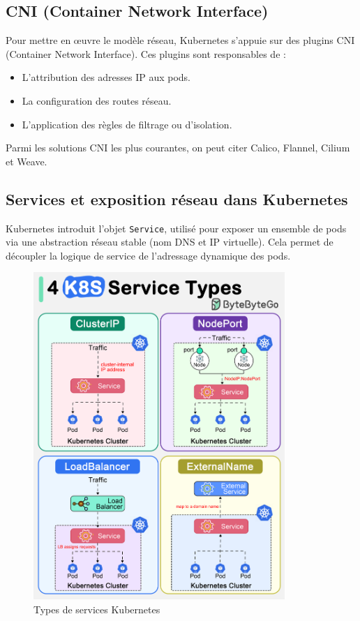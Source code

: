 \subsection{CNI (Container Network Interface)}

Pour mettre en œuvre le modèle réseau, Kubernetes s’appuie sur des plugins CNI (Container Network Interface).
Ces plugins sont responsables de :
\begin{itemize}
	\item L’attribution des adresses IP aux pods.
	\item La configuration des routes réseau.
	\item L’application des règles de filtrage ou d’isolation.
\end{itemize}
Parmi les solutions CNI les plus courantes, on peut citer Calico, Flannel, Cilium et Weave.

\subsection{Services et exposition réseau dans Kubernetes}

Kubernetes introduit l’objet \texttt{Service}, utilisé pour exposer un ensemble de pods via une abstraction réseau stable (nom DNS et IP virtuelle). Cela permet de découpler la logique de service de l’adressage dynamique des pods.

\begin{figure}[H]
	\centering
	\includegraphics[width=0.85\textwidth]{figures/k8s-service-types.png}
	\caption{Types de services Kubernetes}
\end{figure}

